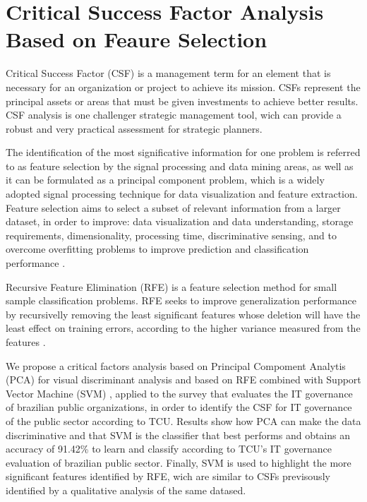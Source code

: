 \chapter{Critical Success Factor Analysis Based on Feaure Selection}
\label{ch:b_csf_fs}


Critical Success Factor (CSF) is a management term for an element that is necessary for an organization or project to achieve its mission. CSFs represent the principal assets or areas that must be given investments to achieve better results. CSF analysis is one challenger strategic management tool, wich can provide a robust and very practical assessment for strategic planners.

The identification of the most significative information for one problem is referred to as feature selection by the signal processing and data mining areas, as well as it can be formulated as a principal component problem, which is a widely adopted signal processing technique for data visualization and feature extraction. Feature selection aims to select a subset of relevant information from a larger dataset, in order to improve: data visualization and data understanding, storage requirements, dimensionality, processing time, discriminative sensing, and to overcome overfitting problems to improve prediction and classification performance \cite{chandrashekar2014survey}.

Recursive Feature Elimination (RFE) is a feature selection method for small sample classification problems. RFE seeks to improve generalization performance by recursivelly removing the least significant features whose deletion will have the least effect on training errors, according to the higher variance measured from the features \cite{chen2007enhanced}.

We propose a critical factors analysis based on Principal Compoment Analytis (PCA) for visual discriminant analysis and based on RFE combined with Support Vector Machine (SVM) \cite{hearst1998support}, applied to the survey that evaluates the IT governance of brazilian public organizations, in order to identify the CSF for IT governance of the public sector according to TCU. Results show how PCA can make the data discriminative and that SVM is the classifier that best performs and obtains an accuracy of 91.42\% to learn and classify according to TCU's IT governance evaluation of brazilian public sector. Finally, SVM is used to highlight the more significant features identified by RFE, wich are similar to CSFs previsously identified by a qualitative analysis of the same datased.

